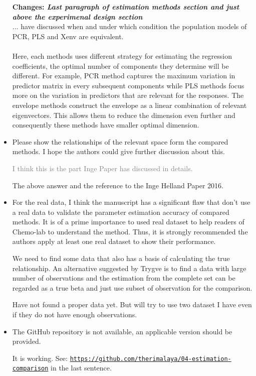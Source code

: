 \documentclass[12pt, a4paper]{scrartcl}
\begin{document}
\begin{itemize}
\textcolor{mycolor1}{\textbf{Changes: \textit{Last paragraph of estimation methods section and just above the experimenal design section}}} \hfill \\
\textcolor{answers}{
... have discussed when and under which condition the population models of PCR, PLS and Xenv are equivalent. \\\\
Here, each methods uses different strategy for estimating the regression coefficients, the optimal number of components they determine will be different. For example, PCR method captures the maximum variation in predictor matrix in every subsequent components while PLS methods focus more on the variation in predictors that are relevant for the responses. The envelope methods construct the envelope as a linear combination of relevant eigenvectors. This allows them to reduce the dimension even further and consequently these methods have smaller optimal dimension.
}

\item Please show the relationships of the relevant space form the compared methods. I hope the authors could give further discussion about this.

\textcolor{gray}{I think this is the part Inge Paper has discussed in details.}

\textcolor{answers}{The above answer and the reference to the Inge Helland Paper 2016.}

\item For the real data, I think the manuscript has a significant flaw that don't use a real data to validate the parameter estimation accuracy of compared methods. It is of a prime importance to used real dataset to help readers of Chemo-lab to understand the method. Thus, it is strongly recommended the authors apply at least one real dataset to show their performance.

\textcolor{mycolor1}{We need to find some data that also has a basis of calculating the true relationship. An alternative suggested by Trygve is to find a data with large number of observations and the estimation from the complete set can be regarded as a true beta and just use subset of observation for the comparison.}

\textcolor{critical}{Have not found a proper data yet. But will try to use two dataset I have even if they do not have enough observations.}

\item The GitHub repository is not available, an applicable version should be provided.

\textcolor{answers}{It is working. See: \href{https://github.com/therimalaya/04-estimation-comparison}{
\textcolor{mycolor1}{\texttt{https://github.com/therimalaya/04-estimation-comparison}}} in the last sentence.}

\end{itemize}
\end{document}
